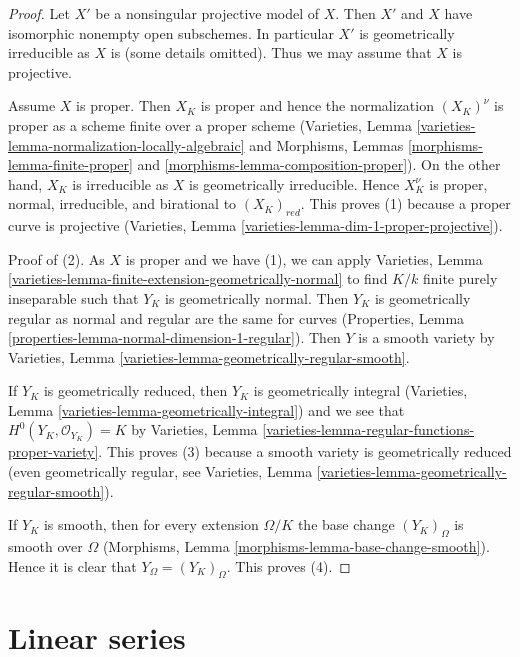 \documentclass{stacks-project}
\theoremstyle{plain}
\theoremstyle{definition}
\theoremstyle{remark}
\numberwithin{equation}{subsection}
\begin{document}
\begin{proof}
Let $X'$ be a nonsingular projective model of $X$. Then $X'$ and
$X$ have isomorphic nonempty open subschemes. In particular
$X'$ is geometrically irreducible as $X$ is (some details omitted).
Thus we may assume that $X$ is projective.

\medskip\noindent
Assume $X$ is proper. Then $X_K$ is proper and hence the normalization
$(X_K)^\nu$ is proper as a scheme finite over a proper scheme
(Varieties, Lemma \ref{varieties-lemma-normalization-locally-algebraic}
and Morphisms, Lemmas \ref{morphisms-lemma-finite-proper} and
\ref{morphisms-lemma-composition-proper}).
On the other hand, $X_K$ is irreducible as $X$ is geometrically
irreducible. Hence $X_K^\nu$ is proper, normal, irreducible, and birational
to $(X_K)_{red}$. This proves (1) because a proper curve is projective
(Varieties, Lemma \ref{varieties-lemma-dim-1-proper-projective}).

\medskip\noindent
Proof of (2). As $X$ is proper and we have (1), we can apply
Varieties, Lemma \ref{varieties-lemma-finite-extension-geometrically-normal}
to find $K/k$ finite purely inseparable such that
$Y_K$ is geometrically normal. Then $Y_K$ is geometrically regular
as normal and regular are the same for curves
(Properties, Lemma \ref{properties-lemma-normal-dimension-1-regular}).
Then $Y$ is a smooth variety by
Varieties, Lemma \ref{varieties-lemma-geometrically-regular-smooth}.

\medskip\noindent
If $Y_K$ is geometrically reduced, then $Y_K$ is geometrically
integral (Varieties, Lemma \ref{varieties-lemma-geometrically-integral})
and we see that $H^0(Y_K, \mathcal{O}_{Y_K}) = K$ by
Varieties, Lemma \ref{varieties-lemma-regular-functions-proper-variety}.
This proves (3) because a smooth variety is geometrically reduced
(even geometrically regular, see
Varieties, Lemma \ref{varieties-lemma-geometrically-regular-smooth}).

\medskip\noindent
If $Y_K$ is smooth, then for every extension $\Omega/K$
the base change $(Y_K)_\Omega$ is smooth over $\Omega$
(Morphisms, Lemma \ref{morphisms-lemma-base-change-smooth}).
Hence it is clear that $Y_\Omega = (Y_K)_\Omega$. This proves (4).
\end{proof}






\section{Linear series}
\label{section-linear-series}
\end{document}
